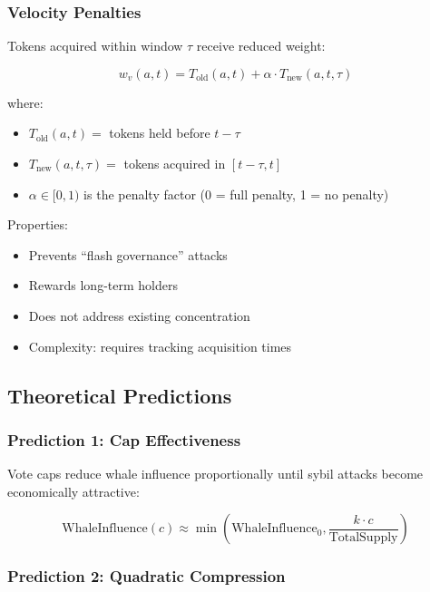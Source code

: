 \subsubsection{Velocity Penalties}

Tokens acquired within window $\tau$ receive reduced weight:

\begin{equation}
w_v(a, t) = T_{\text{old}}(a, t) + \alpha \cdot T_{\text{new}}(a, t, \tau)
\end{equation}

where:
\begin{itemize}
    \item $T_{\text{old}}(a, t) = $ tokens held before $t - \tau$
    \item $T_{\text{new}}(a, t, \tau) = $ tokens acquired in $[t-\tau, t]$
    \item $\alpha \in [0, 1)$ is the penalty factor (0 = full penalty, 1 = no penalty)
\end{itemize}

Properties:
\begin{itemize}
    \item Prevents ``flash governance'' attacks
    \item Rewards long-term holders
    \item Does not address existing concentration
    \item Complexity: requires tracking acquisition times
\end{itemize}

\subsection{Theoretical Predictions}

\subsubsection{Prediction 1: Cap Effectiveness}

Vote caps reduce whale influence proportionally until sybil attacks become economically attractive:

\begin{equation}
\text{WhaleInfluence}(c) \approx \min\left(\text{WhaleInfluence}_0, \frac{k \cdot c}{\text{TotalSupply}}\right)
\end{equation}

\subsubsection{Prediction 2: Quadratic Compression}

